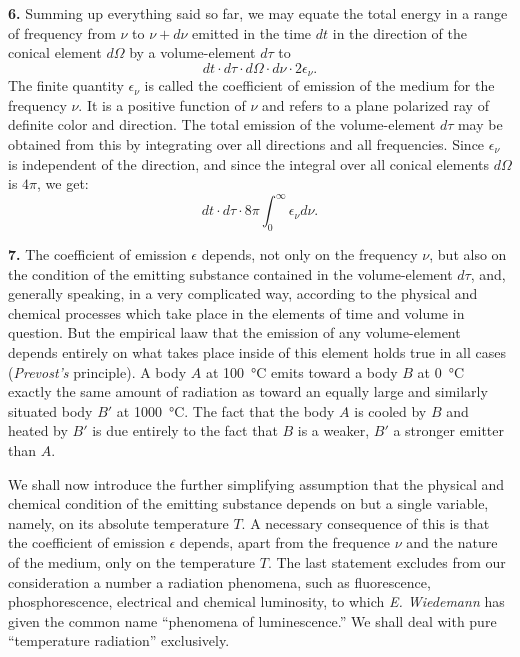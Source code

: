 \documentclass[12pt,oneside]{book}
\begin{document}
\textbf{6.} Summing up everything said so far, we may equate the total energy in a range of frequency from $\nu$ to $\nu+d\nu$ emitted in the time $dt$ in the direction of the conical element $d\Omega$ by a volume-element $d\tau$ to
\begin{equation}
    dt\cdot d\tau\cdot d\Omega\cdot d\nu\cdot 2\epsilon_\nu.
    \label{eq1}
\end{equation}
The finite quantity $\epsilon_\nu$ is called the coefficient of emission of the medium for the frequency $\nu$. It is a positive function of $\nu$ and refers to a plane polarized ray of definite color and direction. The total emission of the volume-element $d\tau$ may be obtained from this by integrating over all directions and all frequencies. Since $\epsilon_\nu$ is independent of the direction, and since the integral over all conical elements $d\Omega$ is $4\pi$, we get:
\begin{equation}
    dt\cdot d\tau\cdot 8\pi\int_0^\infty\epsilon_\nu d\nu.
    \label{eq2}
\end{equation} \par

\textbf{7.} The coefficient of emission $\epsilon$ depends, not only on the frequency $\nu$, but also on the condition of the emitting substance contained in the volume-element $d\tau$, and, generally speaking, in a very complicated way, according to the physical and chemical processes which take place in the elements of time and volume in question. But the empirical laaw that the emission of any volume-element depends entirely on what takes place inside of this element holds true in all cases (\textit{Prevost's} principle). A body $A$ at \SI{100}{\degreeCelsius} emits toward a body $B$ at \SI{0}{\degreeCelsius} exactly the same amount of radiation as toward an equally large and similarly situated body $B'$ at \SI{1000}{\degreeCelsius}. The fact that the body $A$ is cooled by $B$ and heated by $B'$ is due entirely to the fact that $B$ is a weaker, $B'$ a stronger emitter than $A$. \par

We shall now introduce the further simplifying assumption that the physical and chemical condition of the emitting substance depends on but a single variable, namely, on its absolute temperature $T$. A necessary consequence of this is that the coefficient of emission $\epsilon$ depends, apart from the frequence $\nu$ and the nature of the medium, only on the temperature $T$. The last statement excludes from our consideration a number a radiation phenomena, such as fluorescence, phosphorescence, electrical and chemical luminosity, to which \textit{E. Wiedemann} has given the common name ``phenomena of luminescence.'' We shall deal with pure ``temperature radiation'' exclusively. \par
\end{document}
